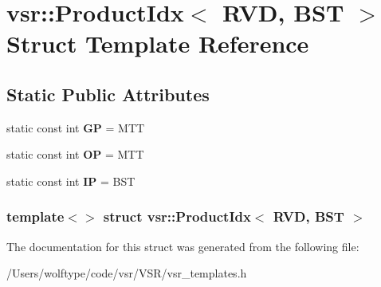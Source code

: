 \hypertarget{structvsr_1_1_product_idx_3_01_r_v_d_00_01_b_s_t_01_4}{\section{vsr\-:\-:Product\-Idx$<$ R\-V\-D, B\-S\-T $>$ Struct Template Reference}
\label{structvsr_1_1_product_idx_3_01_r_v_d_00_01_b_s_t_01_4}
}
\subsection*{Static Public Attributes}
\begin{DoxyCompactItemize}
\item 
\hypertarget{structvsr_1_1_product_idx_3_01_r_v_d_00_01_b_s_t_01_4_a9f97c4bd6979650fc3a588ced8eb3f7c}{static const int {\bfseries G\-P} = M\-T\-T}\label{structvsr_1_1_product_idx_3_01_r_v_d_00_01_b_s_t_01_4_a9f97c4bd6979650fc3a588ced8eb3f7c}

\item 
\hypertarget{structvsr_1_1_product_idx_3_01_r_v_d_00_01_b_s_t_01_4_a8748f7fc7c4b95ec4ff7a1601613cea4}{static const int {\bfseries O\-P} = M\-T\-T}\label{structvsr_1_1_product_idx_3_01_r_v_d_00_01_b_s_t_01_4_a8748f7fc7c4b95ec4ff7a1601613cea4}

\item 
\hypertarget{structvsr_1_1_product_idx_3_01_r_v_d_00_01_b_s_t_01_4_a1792398d104d55b601d5b7a5e6a325cd}{static const int {\bfseries I\-P} = B\-S\-T}\label{structvsr_1_1_product_idx_3_01_r_v_d_00_01_b_s_t_01_4_a1792398d104d55b601d5b7a5e6a325cd}

\end{DoxyCompactItemize}
\subsubsection*{template$<$$>$ struct vsr\-::\-Product\-Idx$<$ R\-V\-D, B\-S\-T $>$}



The documentation for this struct was generated from the following file\-:\begin{DoxyCompactItemize}
\item 
/\-Users/wolftype/code/vsr/\-V\-S\-R/vsr\-\_\-templates.\-h\end{DoxyCompactItemize}
